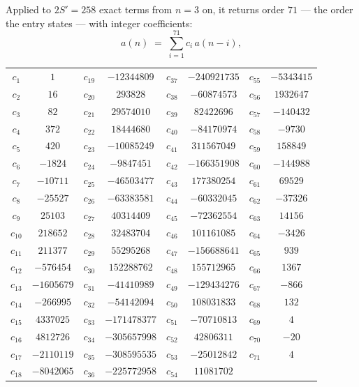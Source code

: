 \documentclass[11pt,a4paper]{article}
\theoremstyle{plain}
\theoremstyle{definition}
\begin{document}
Applied to $2S'=258$ exact terms from $n=3$ on, it returns order $71$ --- the
order the entry states --- with integer coefficients:
\[
a(n)\;=\;\sum_{i=1}^{71}c_i\,a(n-i),
\]
\begin{center}\small
\begin{tabular}{cccccccc}
$c_{1}$ & $1$ & $c_{19}$ & $-12344809$ & $c_{37}$ & $-240921735$ & $c_{55}$ & $-5343415$ \\
$c_{2}$ & $16$ & $c_{20}$ & $293828$ & $c_{38}$ & $-60874573$ & $c_{56}$ & $1932647$ \\
$c_{3}$ & $82$ & $c_{21}$ & $29574010$ & $c_{39}$ & $82422696$ & $c_{57}$ & $-140432$ \\
$c_{4}$ & $372$ & $c_{22}$ & $18444680$ & $c_{40}$ & $-84170974$ & $c_{58}$ & $-9730$ \\
$c_{5}$ & $420$ & $c_{23}$ & $-10085249$ & $c_{41}$ & $311567049$ & $c_{59}$ & $158849$ \\
$c_{6}$ & $-1824$ & $c_{24}$ & $-9847451$ & $c_{42}$ & $-166351908$ & $c_{60}$ & $-144988$ \\
$c_{7}$ & $-10711$ & $c_{25}$ & $-46503477$ & $c_{43}$ & $177380254$ & $c_{61}$ & $69529$ \\
$c_{8}$ & $-25527$ & $c_{26}$ & $-63383581$ & $c_{44}$ & $-60332045$ & $c_{62}$ & $-37326$ \\
$c_{9}$ & $25103$ & $c_{27}$ & $40314409$ & $c_{45}$ & $-72362554$ & $c_{63}$ & $14156$ \\
$c_{10}$ & $218652$ & $c_{28}$ & $32483704$ & $c_{46}$ & $101161085$ & $c_{64}$ & $-3426$ \\
$c_{11}$ & $211377$ & $c_{29}$ & $55295268$ & $c_{47}$ & $-156688641$ & $c_{65}$ & $939$ \\
$c_{12}$ & $-576454$ & $c_{30}$ & $152288762$ & $c_{48}$ & $155712965$ & $c_{66}$ & $1367$ \\
$c_{13}$ & $-1605679$ & $c_{31}$ & $-41410989$ & $c_{49}$ & $-129434276$ & $c_{67}$ & $-866$ \\
$c_{14}$ & $-266995$ & $c_{32}$ & $-54142094$ & $c_{50}$ & $108031833$ & $c_{68}$ & $132$ \\
$c_{15}$ & $4337025$ & $c_{33}$ & $-171478377$ & $c_{51}$ & $-70710813$ & $c_{69}$ & $4$ \\
$c_{16}$ & $4812726$ & $c_{34}$ & $-305657998$ & $c_{52}$ & $42806311$ & $c_{70}$ & $-20$ \\
$c_{17}$ & $-2110119$ & $c_{35}$ & $-308595535$ & $c_{53}$ & $-25012842$ & $c_{71}$ & $4$ \\
$c_{18}$ & $-8042065$ & $c_{36}$ & $-225772958$ & $c_{54}$ & $11081702$ &  &  \\
\end{tabular}
\end{center}
\end{document}
